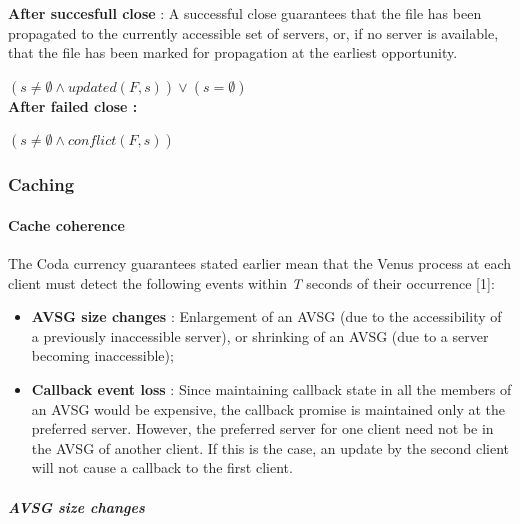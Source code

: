 \textbf{After succesfull close} : A successful close guarantees that the file has been propagated to the currently accessible set of servers, or, if no server is available, that the file has been marked for propagation at the earliest opportunity.

$(s \neq \emptyset \wedge updated(F, s)) \vee (s = \emptyset)$ \\

\textbf{After failed close :}

$(s \neq \emptyset \wedge conflict(F, s))$ \\








\subsubsection{Caching}


\paragraph{Cache coherence}

The Coda currency guarantees stated earlier mean that the Venus process at each client must detect the following events within \textit{T} seconds of their occurrence [1]:
\begin{itemize}
	\item \textbf{AVSG size changes} : Enlargement of an AVSG (due to the accessibility of a previously inaccessible server), or shrinking of an AVSG (due to a server becoming inaccessible);
	\item \textbf{Callback event loss} : Since maintaining callback state in all the members of an AVSG would be expensive, the callback promise is maintained only at the preferred server. However, the preferred server for one client need not be in the AVSG of another client. If this is the case, an update by the second client will not cause a callback to the first client.
\end{itemize}


\subparagraph{AVSG size changes}

